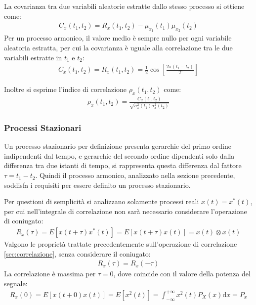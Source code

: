 \documentclass{article}
\newcommand{\df}{\mathrm{d}}
\newcommand{\intinf}{\displaystyle\int_{-\infty}^{+\infty}}
\numberwithin{equation}{subsection}
\begin{document}
La covarianza tra due variabili aleatorie estratte dallo stesso processo si ottiene come:
\begin{gather}
    C_x(t_1,t_2)=R_x(t_1,t_2)-\mu_{x_1}(t_1)\mu_{x_2}(t_2)
\end{gather}
Per un processo armonico, il valore medio è sempre nullo per ogni variabile aleatoria estratta, per cui la covarianza è uguale alla correlazione tra le due variabili 
estratte in $t_1$ e $t_2$:
\begin{gather*}
    C_x(t_1,t_2)=R_x(t_1,t_2)=\displaystyle\frac{1}{2}\cos\left[\frac{2\pi(t_1-t_2)}{T}\right]
\end{gather*} 

Inoltre si esprime l'indice di correlazione $\rho_{x}(t_1,t_2)$ come:
\begin{gather}
    \rho_x(t_1,t_2)=\displaystyle\frac{C_x(t_1,t_2)}{\sqrt{\sigma_x^2(t_1)\sigma_x^2(t_2)}}
\end{gather}

\subsubsection{Processi Stazionari}

Un processo stazionario per definizione presenta gerarchie del primo ordine indipendenti dal tempo, e gerarchie del secondo ordine dipendenti solo dalla differenza tra due 
istanti di tempo, si rappresenta questa differenza dal fattore $\tau=t_1-t_2$. Quindi il processo armonico, analizzato nella sezione precedente, soddisfa i requisiti per essere definito un processo stazionario. 

Per questioni di semplicità si analizzano solamente processi reali $x(t)=x^*(t)$, per cui nell'integrale di correlazione non sarà necessario considerare l'operazione di coniugato:
\begin{gather*}
    R_x(\tau)=E[x(t+\tau)x^*(t)]=E[x(t+\tau)x(t)]=x(t)\otimes x(t)
\end{gather*}
Valgono le proprietà trattate precedentemente sull'operazione di correlazione \ref{sec:correlazione}, senza considerare il coniugato:
\begin{gather*}
    R_x(\tau)=R_x(-\tau)
\end{gather*} 
La correlazione è massima per $\tau=0$, dove coincide con il valore della potenza del segnale:
\begin{gather}
    R_x(0)=E[x(t+0)x(t)]=E[x^2(t)]=\intinf x^2(t)P_X(x)\df x=P_x
\end{gather}
\end{document}
